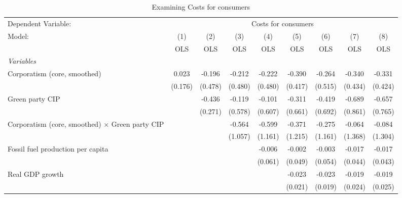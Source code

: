 
\begin{table}[htbp]
   \caption{Examining Costs for consumers}
   \centering
   \begin{tabular}{lcccccccc}
      \toprule
      Dependent Variable: & \multicolumn{8}{c}{Costs for consumers}\\
      Model:                                                 & (1)     & (2)     & (3)     & (4)     & (5)     & (6)     & (7)     & (8)\\  
                                                             &  OLS    & OLS     & OLS     & OLS     & OLS     & OLS     & OLS     & OLS\\  
      \midrule
      \emph{Variables}\\
      Corporatism (core, smoothed)                           & 0.023   & -0.196  & -0.212  & -0.222  & -0.390  & -0.264  & -0.340  & -0.331\\   
                                                             & (0.176) & (0.478) & (0.480) & (0.480) & (0.417) & (0.515) & (0.434) & (0.424)\\   
      Green party CIP                                        &         & -0.436  & -0.119  & -0.101  & -0.311  & -0.419  & -0.689  & -0.657\\   
                                                             &         & (0.271) & (0.578) & (0.607) & (0.661) & (0.692) & (0.861) & (0.765)\\   
      Corporatism (core, smoothed) $\times$ Green party CIP  &         &         & -0.564  & -0.599  & -0.371  & -0.275  & -0.064  & -0.084\\   
                                                             &         &         & (1.057) & (1.161) & (1.215) & (1.161) & (1.368) & (1.304)\\   
      Fossil fuel production per capita                      &         &         &         & -0.006  & -0.002  & -0.003  & -0.017  & -0.017\\   
                                                             &         &         &         & (0.061) & (0.049) & (0.054) & (0.044) & (0.043)\\   
      Real GDP growth                                        &         &         &         &         & -0.023  & -0.023  & -0.019  & -0.019\\   
                                                             &         &         &         &         & (0.021) & (0.019) & (0.024) & (0.025)\\   

\end{tabular}
\end{table}

